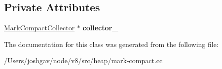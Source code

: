\subsection*{Private Attributes}
\begin{DoxyCompactItemize}
\item 
\hyperlink{classv8_1_1internal_1_1_mark_compact_collector}{Mark\+Compact\+Collector} $\ast$ {\bfseries collector\+\_\+}\hypertarget{classv8_1_1internal_1_1_shared_function_info_marking_visitor_ae023352a4200f623d3b6cdcaa78228ec}{}\label{classv8_1_1internal_1_1_shared_function_info_marking_visitor_ae023352a4200f623d3b6cdcaa78228ec}

\end{DoxyCompactItemize}


The documentation for this class was generated from the following file\+:\begin{DoxyCompactItemize}
\item 
/\+Users/joshgav/node/v8/src/heap/mark-\/compact.\+cc\end{DoxyCompactItemize}
